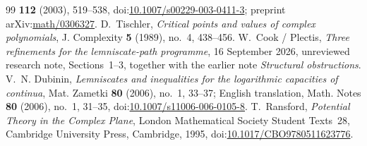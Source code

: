 \documentclass[11pt]{article}
\begin{document}
\begin{thebibliography}{99}
  \textbf{112} (2003), 519--538,
  doi:\href{https://doi.org/10.1007/s00229-003-0411-3}{10.1007/s00229-003-0411-3};
  preprint arXiv:\href{https://arxiv.org/abs/math/0306327}{math/0306327}.
 D.~Tischler,
  \emph{Critical points and values of complex polynomials},
  J. Complexity \textbf{5} (1989), no.~4, 438--456.
 W.~Cook / Plectis,
  \emph{Three refinements for the lemniscate-path programme}, 16 September 2026,
  unreviewed research note, Sections~1--3, together with the earlier
  note \emph{Structural obstructions}.
 V.~N. Dubinin,
  \emph{Lemniscates and inequalities for the logarithmic capacities of
  continua}, Mat. Zametki \textbf{80} (2006), no.~1, 33--37;
  English translation, Math. Notes \textbf{80} (2006), no.~1, 31--35,
  doi:\href{https://doi.org/10.1007/s11006-006-0105-8}{10.1007/s11006-006-0105-8}.
 T.~Ransford,
  \emph{Potential Theory in the Complex Plane}, London Mathematical Society
  Student Texts~28, Cambridge University Press, Cambridge, 1995,
  doi:\href{https://doi.org/10.1017/CBO9780511623776}{10.1017/CBO9780511623776}.
\end{thebibliography}
\end{document}
